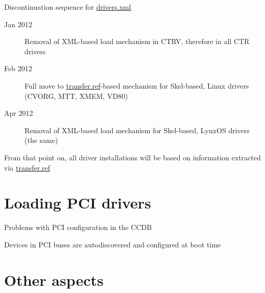 \documentclass[compress,red]{beamer}
\begin{document}
\begin{frame}{Discontinuation sequence for \url{drivers.xml}}

\begin{description}
\item[Jan 2012] Removal of XML-based load mechanism in CTRV, therefore
	in all CTR drivers
\item[Feb 2012] Full move to \url{transfer.ref}-based mechanism
	for Skel-based, Linux drivers (CVORG, MTT, XMEM, VD80)
\item[Apr 2012] Removal of XML-based load mechanism for Skel-based,
	LynxOS drivers (the same)
\end{description}

From that point on, all driver installations will be based on
information extracted via \url{transfer.ref}
\end{frame}

\section{Loading PCI drivers}

\begin{frame}{Problems with PCI configuration in the CCDB}

Devices in PCI buses are autodiscovered and configured at boot
time

\end{frame}

\section{Other aspects}
\end{document}

